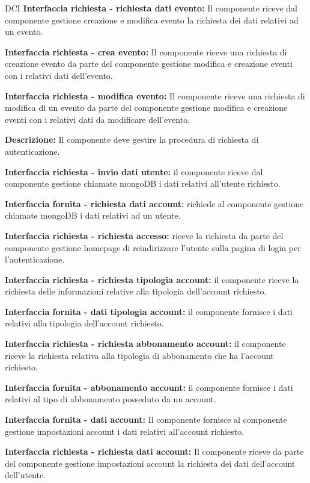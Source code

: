\begin{listaPersonale}{DCI}
    \textbf{Interfaccia richiesta - richiesta dati evento:} Il componente riceve dal componente gestione creazione e modifica evento la richiesta dei dati relativi ad un evento.

    \textbf{Interfaccia richiesta - crea evento:} Il componente riceve una richiesta di creazione evento da parte del componente gestione modifica e creazione eventi con i relativi dati dell'evento.

    \textbf{Interfaccia richiesta - modifica evento:} Il componente riceve una richiesta di modifica di un evento da parte del componente gestione modifica e creazione eventi con i relativi dati da modificare dell'evento.





    \textbf{Descrizione:}  Il componente deve gestire la procedura di richiesta di autenticazione.

    \textbf{Interfaccia richiesta - invio dati utente:} il componente riceve dal componente gestione chiamate mongoDB i dati relativi all'utente richiesto.

    \textbf{Interfaccia fornita - richiesta dati account:} richiede al componente gestione chiamate mongoDB i dati relativi ad un utente.

    \textbf{Interfaccia richiesta - richiesta accesso:} riceve la richiesta da parte del componente gestione homepage di reindirizzare l'utente sulla pagina di login per l'autenticazione.

    \textbf{Interfaccia richiesta - richiesta tipologia account:} il componente riceve la richiesta delle informazioni relative alla tipologia dell'account richiesto.

    \textbf{Interfaccia fornita - dati tipologia account:} il componente fornisce i dati relativi alla tipologia dell'account richiesto.

    \textbf{Interfaccia richiesta - richiesta abbonamento account:} il componente riceve la richiesta relativa alla tipologia di abbonamento che ha l'account richiesto.

    \textbf{Interfaccia fornita - abbonamento account:} il componente fornisce i dati relativi al tipo di abbonamento posseduto da un account.

    \textbf{Interfaccia fornita - dati account:} Il componente fornisce al componente gestione impostazioni account i dati relativi all'account richiesto.

    \textbf{Interfaccia richiesta - richiesta dati account:} Il componente riceve da parte del componente gestione impostazioni account la richiesta dei dati dell'account dell'utente.


\end{listaPersonale}
